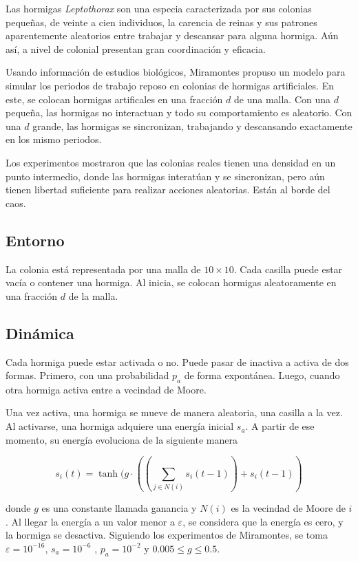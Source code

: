 \documentclass{article}
\begin{document}
Las hormigas \textit{Leptothorax} son una especia caracterizada
por sus colonias pequeñas, de veinte a cien individuos, la carencia de reinas y
sus patrones aparentemente aleatorios entre trabajar y descansar para alguna
hormiga. Aún así, a nivel de colonial presentan gran coordinación y eficacia.

Usando información de estudios biológicos, Miramontes \cite{Miramontes_1995}
propuso un modelo para simular los periodos de trabajo reposo en colonias de
hormigas artificiales. En este, se colocan hormigas artificales en una fracción
$d$ de una malla. Con una $d$ pequeña, las hormigas no interactuan y todo su
comportamiento es aleatorio. Con una $d$ grande, las hormigas se sincronizan,
trabajando y descansando exactamente en los mismo periodos.

Los experimentos mostraron que las colonias reales tienen una densidad en un
punto intermedio, donde las hormigas interatúan y se sincronizan, pero aún
tienen libertad suficiente para realizar acciones aleatorias. Están al borde del
caos.

\subsection{Entorno}

La colonia está representada por una malla de $10 \times 10$. Cada casilla puede
estar vacía o contener una hormiga. Al inicia, se colocan hormigas aleatoramente
en una fracción $d$ de la malla.

\subsection{Dinámica}

Cada hormiga puede estar activada o no. Puede pasar de inactiva a activa de dos
formas. Primero, con una probabilidad $p_{a}$ de forma expontánea. Luego, cuando
otra hormiga activa entre a vecindad de Moore.

Una vez activa, una hormiga se mueve de manera aleatoria, una casilla a la vez.
Al activarse, una hormiga adquiere una energía inicial $s_{a}$. A partir de ese
momento, su energía evoluciona de la siguiente manera

\begin{equation}
  s_{i}(t) = \tanh(g \cdot ((\sum_{j \in N(i)}{s_{i}(t-1)}) + s_{i}(t-1))
\end{equation}

donde $g$ es una constante llamada ganancia y $N(i)$ es la vecindad de Moore de
$i$. Al llegar la energía a un valor menor a $\varepsilon$, se considera que la
energía es cero, y la hormiga se desactiva. Siguiendo los experimentos de
Miramontes, se toma $\varepsilon = 10^{-16}$, $s_{a} = 10^{-6}$ ,
$p_{a} = 10^{-2}$ y $0.005 \le g \le 0.5$.
\end{document}
